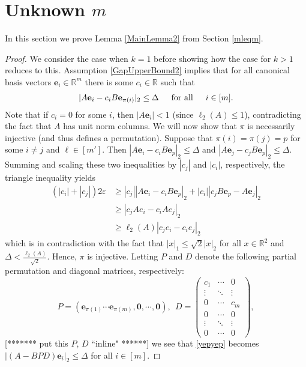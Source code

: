 \documentclass[journal, onecolumn]{IEEEtran}
\begin{document}
\section{Unknown $m$}\label{mleqmAppendix}

In this section we prove Lemma \ref{MainLemma2} from Section \ref{mleqm}.


\begin{proof}
We consider the case when $k=1$ before showing how the case for $k>1$ reduces to this. Assumption \eqref{GapUpperBound2} implies that for all canonical basis vectors $\mathbf{e}_i \in \mathbb{R}^m$ there is some $c_i \in \mathbb{R}$ such that 
\begin{align}\label{yepyep}
|A\mathbf{e}_i - c_iB\mathbf{e}_{\pi(i)}|_2 \leq \Delta \indent \text{for all} \indent i \in [m].
\end{align}
Note that if $c_i = 0$ for some $i$, then $|A\mathbf{e}_i| < 1$ (since $\ell_2(A) \leq 1$), contradicting the fact that $A$ has unit norm columns. We will now show that $\pi$ is necessarily injective (and thus defines a permutation). Suppose that $\pi(i) = \pi(j) = p$ for some $i \neq j$ and $\ell \in [m']$. Then $|A\mathbf{e}_i - c_iB\mathbf{e}_{p}|_2  \leq \Delta$ and $|A\mathbf{e}_j - c_jB\mathbf{e}_{p}|_2 \leq \Delta$. Summing and scaling these two inequalities by $|c_j|$ and $|c_i|$, respectively, the triangle inequality yields
\begin{align*}
(|c_i| + |c_j|) 2\varepsilon
&\geq |c_j||A\mathbf{e}_i - c_iB\mathbf{e}_{p}|_2 + |c_i||c_jB\mathbf{e}_{p} - A\mathbf{e}_j|_2 \\
&\geq |c_jAe_i - c_iAe_j|_2 \\
&\geq \ell_2(A)|c_je_i - c_ie_j|_2
\end{align*}
%
which is in contradiction with the fact that $|x|_1 \leq \sqrt{2}|x|_2$ for all $x \in \mathbb{R}^2$ and $\Delta < \frac{\ell_2(A)}{\sqrt{2}}$. Hence, $\pi$ is injective. Letting $P$ and $D$ denote the following partial permutation and diagonal matrices, respectively: 
\begin{equation}\label{PandD}
P = \left( \mathbf{e}_{\pi(1)} \cdots \mathbf{e}_{\pi(m)}, \mathbf{0}, \cdots, \mathbf{0} \right), \ \ D = \left(\begin{array}{ccc}c_1 & \cdots & 0 \\\vdots & \ddots & \vdots \\0 & \cdots & c_m \\ 0 & \cdots & 0 \\ \vdots & \ddots & \vdots \\ 0 & \cdots & 0
\end{array}\right),
\end{equation}
[******* put this $P$, $D$ ``inline" ******]
we see that \eqref{yepyep} becomes $|(A - BPD)\mathbf{e}_i|_2 \leq \Delta$ for all $i \in [m]$.


\end{proof}
\end{document}
